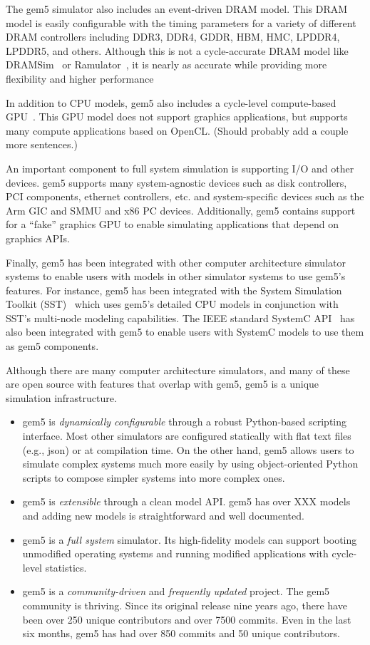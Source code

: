 The gem5 simulator also includes an event-driven DRAM model.
This DRAM model is easily configurable with the timing parameters for a variety of different DRAM controllers including DDR3, DDR4, GDDR, HBM, HMC, LPDDR4, LPDDR5, and others.
Although this is not a cycle-accurate DRAM model like DRAMSim~\cite{} or Ramulator~\cite{}, it is nearly as accurate while providing more flexibility and higher performance~\cite{hansson-ispass-paper}

In addition to CPU models, gem5 also includes a cycle-level compute-based GPU~\cite{}.
This GPU model does not support graphics applications, but supports many compute applications based on OpenCL.
(Should probably add a couple more sentences.)

An important component to full system simulation is supporting I/O and other devices.
gem5 supports many system-agnostic devices such as disk controllers, PCI components, ethernet controllers, etc. and system-specific devices such as the Arm GIC and SMMU and x86 PC devices.
Additionally, gem5 contains support for a ``fake'' graphics GPU to enable simulating applications that depend on graphics APIs.

Finally, gem5 has been integrated with other computer architecture simulator systems to enable users with models in other simulator systems to use gem5's features.
For instance, gem5 has been integrated with the System Simulation Toolkit (SST)~\cite{} which uses gem5's detailed CPU models in conjunction with SST's multi-node modeling capabilities.
The IEEE standard SystemC API~\cite{} has also been integrated with gem5 to enable users with SystemC models to use them as gem5 components.

Although there are many computer architecture simulators, and many of these are open source with features that overlap with gem5, gem5 is a unique simulation infrastructure.
\begin{itemize}
    \item gem5 is \emph{dynamically configurable} through a robust Python-based scripting interface. Most other simulators are configured statically with flat text files (e.g., json) or at compilation time. On the other hand, gem5 allows users to simulate complex systems much more easily by using object-oriented Python scripts to compose simpler systems into more complex ones.
    \item gem5 is \emph{extensible} through a clean model API. gem5 has over XXX models and adding new models is straightforward and well documented.
    \item gem5 is a \emph{full system} simulator. Its high-fidelity models can support booting unmodified operating systems and running modified applications with cycle-level statistics.
    \item gem5 is a \emph{community-driven} and \emph{frequently updated} project. The gem5 community is thriving. Since its original release nine years ago, there have been over 250 unique contributors and over 7500 commits. Even in the last six months, gem5 has had over 850 commits and 50 unique contributors.
\end{itemize}

